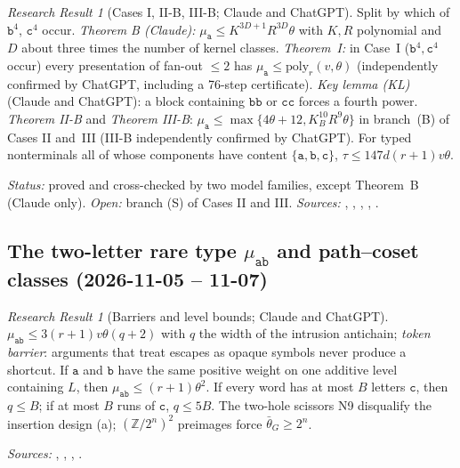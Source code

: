 \documentclass[11pt]{article}
\numberwithin{equation}{section}
\theoremstyle{plain}
\theoremstyle{definition}
\theoremstyle{remark}
\newtheorem{rresult}[theorem]{Research Result}
\theoremstyle{plain}
\begin{document}
\begin{rresult}[Cases I, II-B, III-B; Claude and ChatGPT]
\label{rr:mu-a-cases}
Split by which of $\mathtt b^4$, $\mathtt c^4$ occur.
\emph{Theorem B (Claude):} $\mu_{\mathtt a}\le K^{3D+1}R^{3D}\theta$ with $K,R$
polynomial and $D$ about three times the number of kernel classes.
\emph{Theorem~I:} in Case~I ($\mathtt b^4,\mathtt c^4$ occur) every presentation of
fan-out $\le2$ has $\mu_{\mathtt a}\le\mathrm{poly}_r(v,\theta)$ (independently confirmed
by ChatGPT, including a 76-step certificate).
\emph{Key lemma (KL)} (Claude and ChatGPT): a block containing $\mathtt{bb}$ or $\mathtt{cc}$
forces a fourth power.  \emph{Theorem II-B} and \emph{Theorem III-B}:
$\mu_{\mathtt a}\le\max\{4\theta+12,K_B^{10}R^9\theta\}$ in branch~(B) of Cases II
and~III (III-B independently confirmed by ChatGPT).  For typed nonterminals all of
whose components have content $\{\mathtt a,\mathtt b,\mathtt c\}$,
$\tau\le147d(r+1)v\theta$.
\end{rresult}
\noindent\emph{Status:} proved and cross-checked by two model families, except
Theorem~B (Claude only).  \emph{Open:} branch (S) of Cases II and III.
\emph{Sources:} ,
, ,
, .

\subsection{The two-letter rare type \texorpdfstring{$\mu_{\mathtt{ab}}$}{mu-ab} and path--coset classes (2026-11-05 -- 11-07)}

\begin{rresult}[Barriers and level bounds; Claude and ChatGPT]
\label{rr:mu-ab-barriers}
$\mu_{\mathtt{ab}}\le3(r+1)v\theta(q+2)$ with $q$ the width of the intrusion antichain;
\emph{token barrier}: arguments that treat escapes as opaque symbols never produce a
shortcut.  If $\mathtt a$ and $\mathtt b$ have the same positive weight on one additive
level containing $L$, then $\mu_{\mathtt{ab}}\le(r+1)\theta^2$.  If every word has at most
$B$ letters $\mathtt c$, then $q\le B$; if at most $B$ runs of $\mathtt c$, $q\le5B$.
The two-hole scissors N9 disqualify the insertion design (a); $(\mathbb Z/2^n)^2$
preimages force $\bar\theta_G\ge2^n$.
\end{rresult}
\noindent\emph{Sources:} , ,
, .
\end{document}
